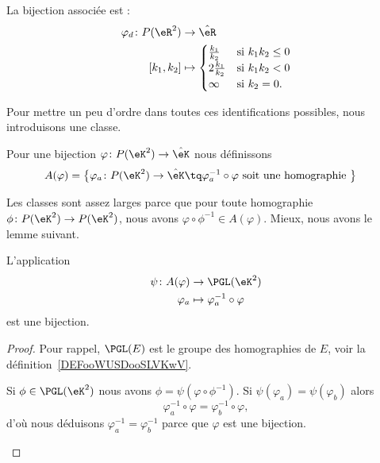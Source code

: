 La bijection associée est :
\begin{equation}        \label{EQooMIGCooAtXPaS}
	\begin{aligned}
		\varphi_d\colon P(\eR^2) & \to \hat\eR                                            \\
		[k_1,k_2]                & \mapsto \begin{cases}
			                                   \frac{ k_1 }{ k_2 }  & \text{si } k_1k_2\leq 0 \\
			                                   2\frac{ k_1 }{ k_2 } & \text{si } k_1k_2<0     \\
			                                   \infty               & \text{si } k_2=0.
		                                   \end{cases}
	\end{aligned}
\end{equation}

Pour mettre un peu d'ordre dans toutes ces identifications possibles, nous introduisons une classe.

\begin{definition}      \label{DEFooMLQUooGwvQMh}
	Pour une bijection \( \varphi\colon P(\eK^2)\to \hat\eK\) nous définissons
	\begin{equation}
		\begin{aligned}[]
			A(\varphi)=\big\{  \varphi_a\colon P(\eK^2) & \to \hat\eK \tq \varphi_a^{-1}\circ\varphi
			\text{ soit une homographie } \big\}
		\end{aligned}
	\end{equation}
\end{definition}

Les classes sont assez larges parce que pour toute homographie \( \phi\colon P(\eK^2)\to P(\eK^2)\), nous avons \( \varphi\circ\phi^{-1}\in A(\varphi)\). Mieux, nous avons le lemme suivant.

\begin{lemma}
	L'application
	\begin{equation}
		\begin{aligned}
			\psi\colon A(\varphi) & \to \PGL(\eK^2)                    \\
			\varphi_a             & \mapsto \varphi_a^{-1}\circ\varphi
		\end{aligned}
	\end{equation}
	est une bijection.
\end{lemma}

\begin{proof}
	Pour rappel, \( \PGL(E)\) est le groupe des homographies de \( E\), voir la définition~\ref{DEFooWUSDooSLVKwV}.
	\begin{subproof}
		\spitem[Surjectif]
		Si \( \phi\in\PGL(\eK^2)\) nous avons \( \phi=\psi(\varphi\circ\phi^{-1})\).
		\spitem[Injectif]
		Si \( \psi(\varphi_a)=\psi(\varphi_b)\) alors
		\begin{equation}
			\varphi_a^{-1}\circ\varphi=\varphi_b^{-1}\circ\varphi,
		\end{equation}
		d'où nous déduisons \( \varphi_a^{-1}=\varphi_b^{-1}\) parce que \( \varphi\) est une bijection.
	\end{subproof}
\end{proof}

